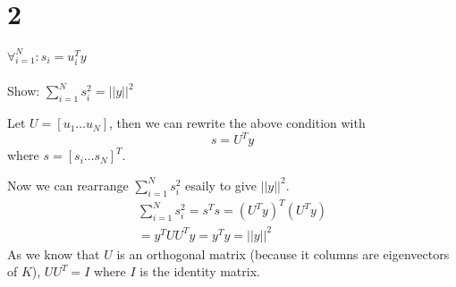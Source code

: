 \section*{2}

$\forall_{i=1}^N : s_i = u_i^T y$ \\ \\
Show: $\sum_{i=1}^N s_i^2 = ||y||^2$

Let $U = [u_1 \ldots u_N]$, then we can rewrite the above condition with
\begin{equation}
s = U^T y
\end{equation}
where $s = [s_i \ldots s_N]^T$.

Now we can rearrange $\sum_{i=1}^N s_i^2$ esaily to give $||y||^2$.
\begin{gather*}
\sum_{i=1}^N s_i^2 = s^Ts = (U^T y)^T (U^T y) \\
= y^T U U^T y = y^Ty = ||y||^2
\end{gather*}
As we know that $U$ is an orthogonal matrix (because it columns are eigenvectors of $K$),
$U U^T = I $ where $I$ is the identity matrix.

